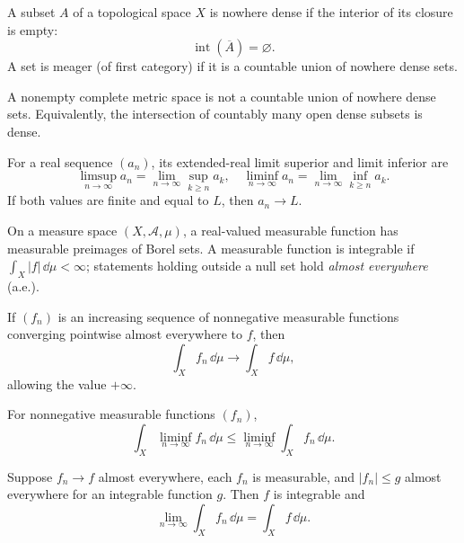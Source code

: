 \begin{definition}
A subset $A$ of a topological space $X$ is nowhere dense if the interior of its closure is empty:
\[
 \operatorname{int}(\overline A)=\varnothing.
\]
A set is meager (of first category) if it is a countable union of nowhere dense sets.
\end{definition}

\begin{theorem}
A nonempty complete metric space is not a countable union of nowhere dense sets. Equivalently, the intersection of countably many open dense subsets is dense.
\end{theorem}

\begin{definition}
For a real sequence $(a_n)$, its extended-real limit superior and limit inferior are
\[
 \limsup_{n\to\infty}a_n=\lim_{n\to\infty}\sup_{k\ge n}a_k,
\quad
 \liminf_{n\to\infty}a_n=\lim_{n\to\infty}\inf_{k\ge n}a_k.
\]
If both values are finite and equal to $L$, then $a_n\to L$.
\end{definition}

\begin{definition}
On a measure space $(X,\mathcal{A},\mu)$, a real-valued measurable function has measurable preimages of Borel sets. A measurable function is integrable if $\int_X|f|\,\dd\mu<\infty$; statements holding outside a null set hold \emph{almost everywhere} (a.e.).
\end{definition}

\begin{theorem}
If $(f_n)$ is an increasing sequence of nonnegative measurable functions converging pointwise almost everywhere to $f$, then
\[
 \int_X f_n\,\dd\mu\longrightarrow\int_X f\,\dd\mu,
\]
allowing the value $+\infty$.
\end{theorem}

\begin{theorem}
For nonnegative measurable functions $(f_n)$,
\[
 \int_X\liminf_{n\to\infty}f_n\,\dd\mu
 \le\liminf_{n\to\infty}\int_X f_n\,\dd\mu.
\]
\end{theorem}

\begin{theorem}
Suppose $f_n\to f$ almost everywhere, each $f_n$ is measurable, and $|f_n|\le g$ almost everywhere for an integrable function $g$. Then $f$ is integrable and
\[
 \lim_{n\to\infty}\int_X f_n\,\dd\mu
 =\int_X f\,\dd\mu.
\]
\end{theorem}

